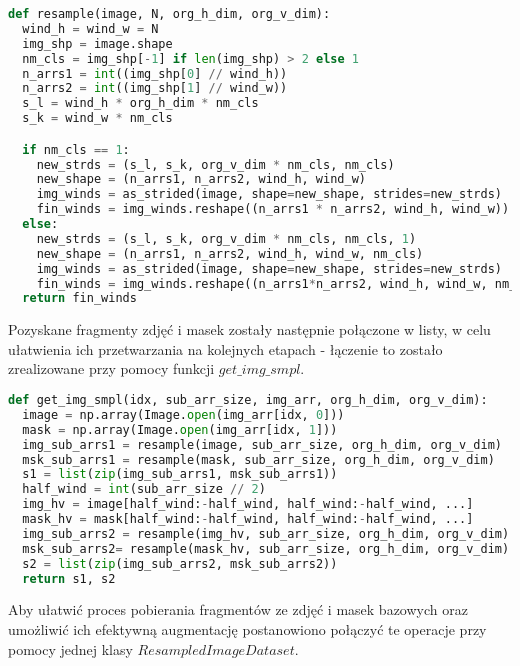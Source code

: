\cell
\begin{lstlisting}[name=Rozdzial3.1, language=Python]
def resample(image, N, org_h_dim, org_v_dim):
  wind_h = wind_w = N
  img_shp = image.shape
  nm_cls = img_shp[-1] if len(img_shp) > 2 else 1
  n_arrs1 = int((img_shp[0] // wind_h))
  n_arrs2 = int((img_shp[1] // wind_w))
  s_l = wind_h * org_h_dim * nm_cls
  s_k = wind_w * nm_cls

  if nm_cls == 1:
    new_strds = (s_l, s_k, org_v_dim * nm_cls, nm_cls)
    new_shape = (n_arrs1, n_arrs2, wind_h, wind_w)
    img_winds = as_strided(image, shape=new_shape, strides=new_strds)
    fin_winds = img_winds.reshape((n_arrs1 * n_arrs2, wind_h, wind_w))
  else:
    new_strds = (s_l, s_k, org_v_dim * nm_cls, nm_cls, 1)
    new_shape = (n_arrs1, n_arrs2, wind_h, wind_w, nm_cls)
    img_winds = as_strided(image, shape=new_shape, strides=new_strds)
    fin_winds = img_winds.reshape((n_arrs1*n_arrs2, wind_h, wind_w, nm_cls))
  return fin_winds
\end{lstlisting}


\cell
Pozyskane fragmenty zdjęć i masek zostały następnie połączone w listy, w celu ułatwienia ich przetwarzania na kolejnych etapach - łączenie to zostało zrealizowane przy pomocy funkcji $\textit{get$\_$img$\_$smpl}$.

\cell
\begin{lstlisting}[name=Rozdzial3.1, language=Python]
def get_img_smpl(idx, sub_arr_size, img_arr, org_h_dim, org_v_dim):
  image = np.array(Image.open(img_arr[idx, 0]))
  mask = np.array(Image.open(img_arr[idx, 1]))
  img_sub_arrs1 = resample(image, sub_arr_size, org_h_dim, org_v_dim)
  msk_sub_arrs1 = resample(mask, sub_arr_size, org_h_dim, org_v_dim)
  s1 = list(zip(img_sub_arrs1, msk_sub_arrs1))
  half_wind = int(sub_arr_size // 2)
  img_hv = image[half_wind:-half_wind, half_wind:-half_wind, ...]
  mask_hv = mask[half_wind:-half_wind, half_wind:-half_wind, ...]
  img_sub_arrs2 = resample(img_hv, sub_arr_size, org_h_dim, org_v_dim)
  msk_sub_arrs2= resample(mask_hv, sub_arr_size, org_h_dim, org_v_dim)
  s2 = list(zip(img_sub_arrs2, msk_sub_arrs2))
  return s1, s2
\end{lstlisting}


\cell
Aby ułatwić proces pobierania fragmentów ze zdjęć i masek bazowych oraz umożliwić ich efektywną augmentację postanowiono połączyć te operacje przy pomocy jednej klasy $\textit{ResampledImageDataset}$.

